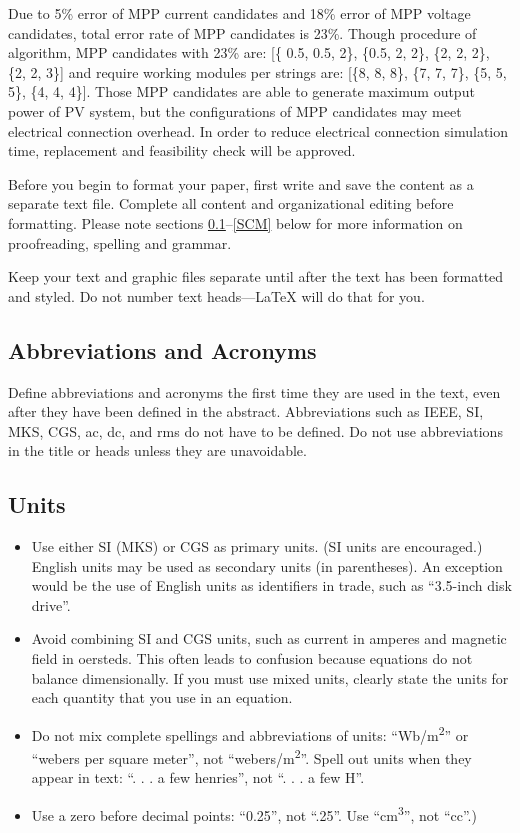 \documentclass[conference]{IEEEtran}
\begin{document}
Due to 5\% error of MPP current candidates and 18\% error of MPP voltage candidates, total error rate of MPP candidates is 23\%. Though procedure of algorithm, MPP candidates with 23\% are: [\{ 0.5, 0.5, 2\}, \{0.5, 2, 2\}, \{2, 2, 2\}, \{2, 2, 3\}] and require working modules per strings are: [\{8, 8, 8\}, \{7, 7, 7\}, \{5, 5, 5\}, \{4, 4, 4\}]. Those MPP candidates are able to generate maximum output power of PV system, but the configurations of MPP candidates may meet electrical connection overhead. In order to reduce electrical connection simulation time, replacement and feasibility check will be approved. 







\vspace{100pt}
Before you begin to format your paper, first write and save the content as a 
separate text file. Complete all content and organizational editing before 
formatting. Please note sections \ref{AA}--\ref{SCM} below for more information on 
proofreading, spelling and grammar.

Keep your text and graphic files separate until after the text has been 
formatted and styled. Do not number text heads---{\LaTeX} will do that 
for you.

\subsection{Abbreviations and Acronyms}\label{AA}
Define abbreviations and acronyms the first time they are used in the text, 
even after they have been defined in the abstract. Abbreviations such as 
IEEE, SI, MKS, CGS, ac, dc, and rms do not have to be defined. Do not use 
abbreviations in the title or heads unless they are unavoidable.

\subsection{Units}
\begin{itemize}
\item Use either SI (MKS) or CGS as primary units. (SI units are encouraged.) English units may be used as secondary units (in parentheses). An exception would be the use of English units as identifiers in trade, such as ``3.5-inch disk drive''.
\item Avoid combining SI and CGS units, such as current in amperes and magnetic field in oersteds. This often leads to confusion because equations do not balance dimensionally. If you must use mixed units, clearly state the units for each quantity that you use in an equation.
\item Do not mix complete spellings and abbreviations of units: ``Wb/m\textsuperscript{2}'' or ``webers per square meter'', not ``webers/m\textsuperscript{2}''. Spell out units when they appear in text: ``. . . a few henries'', not ``. . . a few H''.
\item Use a zero before decimal points: ``0.25'', not ``.25''. Use ``cm\textsuperscript{3}'', not ``cc''.)
\end{itemize}
\end{document}
